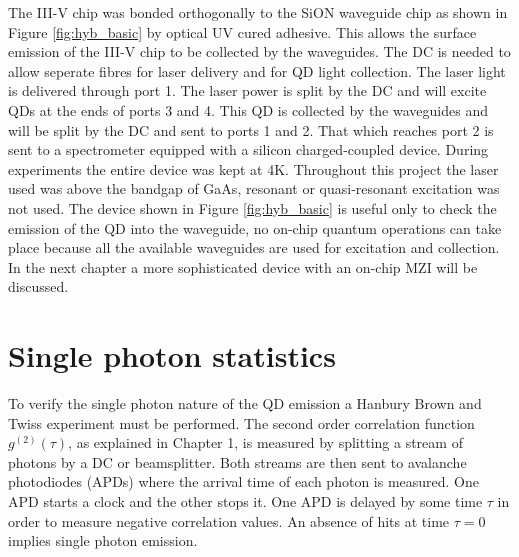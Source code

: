 The III-V chip was bonded orthogonally to the SiON waveguide chip as shown in
Figure \ref{fig:hyb_basic} by optical UV cured adhesive. This allows the surface
emission of the III-V chip to be collected by the waveguides. The DC is needed
to allow seperate fibres for laser delivery and for QD light collection. The
laser light is delivered through port 1. The laser power is split by the DC and
will excite QDs at the ends of ports 3 and 4. This QD is collected by the
waveguides and will be split by the DC and sent to ports 1 and 2. That which
reaches port 2 is sent to a spectrometer equipped with a silicon charged-coupled
device. During experiments the entire device was kept at 4K. Throughout this
project the laser used was above the bandgap of GaAs, resonant or quasi-resonant
excitation was not used. The device shown in Figure \ref{fig:hyb_basic} is
useful only to check the emission of the QD into the waveguide, no on-chip
quantum operations can take place because all the available waveguides are used
for excitation and collection. In the next chapter a more sophisticated device
with an on-chip MZI will be discussed.

\section{Single photon statistics}

To verify the single photon nature of the QD emission a Hanbury Brown and Twiss
experiment must be performed. The second order correlation function
$g^{(2)}(\tau)$, as explained in Chapter 1, is measured by splitting a stream of
photons by a DC or beamsplitter. Both streams are then sent to avalanche
photodiodes (APDs) where the arrival time of each photon is measured. One APD
starts a clock and the other stops it. One APD is delayed by some time $\tau$ in
order to measure negative correlation values. An absence of hits at time $\tau =
0$ implies single photon emission.
